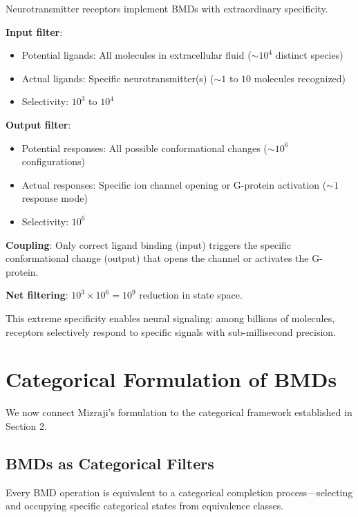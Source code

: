 \begin{example}
\label{ex:receptor_bmd}
Neurotransmitter receptors implement BMDs with extraordinary specificity.

\textbf{Input filter}:
\begin{itemize}
\item Potential ligands: All molecules in extracellular fluid ($\sim 10^4$ distinct species)
\item Actual ligands: Specific neurotransmitter(s) ($\sim 1$ to $10$ molecules recognized)
\item Selectivity: $10^3$ to $10^4$
\end{itemize}

\textbf{Output filter}:
\begin{itemize}
\item Potential responses: All possible conformational changes ($\sim 10^{6}$ configurations)
\item Actual responses: Specific ion channel opening or G-protein activation ($\sim 1$ response mode)
\item Selectivity: $10^6$
\end{itemize}

\textbf{Coupling}: Only correct ligand binding (input) triggers the specific conformational change (output) that opens the channel or activates the G-protein.

\textbf{Net filtering}: $10^3 \times 10^6 = 10^9$ reduction in state space.

This extreme specificity enables neural signaling: among billions of molecules, receptors selectively respond to specific signals with sub-millisecond precision.
\end{example}

\section{Categorical Formulation of BMDs}

We now connect Mizraji's formulation to the categorical framework established in Section 2.

\subsection{BMDs as Categorical Filters}

\begin{theorem}
\label{thm:bmd_categorical}
Every BMD operation is equivalent to a categorical completion process—selecting and occupying specific categorical states from equivalence classes.
\end{theorem}

